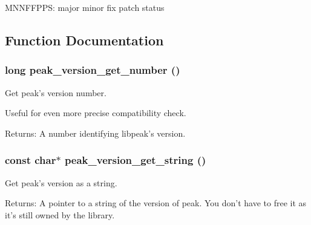 MNNFFPPS: major minor fix patch status 

\subsection{Function Documentation}
\hypertarget{group__version_ga0}{
\subsubsection[peak\_\-version\_\-get\_\-number]{\setlength{\rightskip}{0pt plus 5cm}long peak\_\-version\_\-get\_\-number ()}}
\label{group__version_ga0}


Get peak's version number. 

Useful for even more precise compatibility check.

\begin{Desc}
\item[Returns:]A number identifying libpeak's version. \end{Desc}
\hypertarget{group__version_ga1}{
\subsubsection[peak\_\-version\_\-get\_\-string]{\setlength{\rightskip}{0pt plus 5cm}const char$\ast$ peak\_\-version\_\-get\_\-string ()}}
\label{group__version_ga1}


Get peak's version as a string. 

\begin{Desc}
\item[Returns:]A pointer to a string of the version of peak. You don't have to free it as it's still owned by the library. \end{Desc}
